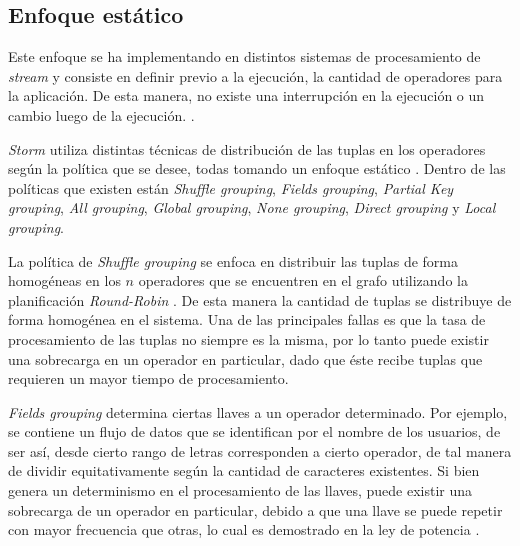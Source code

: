 
\subsection{Enfoque estático}
\label{subsec:enfoqueEstaticoBC}
Este enfoque se ha implementando en distintos sistemas de procesamiento de \textsl{stream} y consiste en definir previo a la ejecución, la cantidad de operadores para la aplicación. De esta manera, no existe una interrupción en la ejecución o un cambio luego de la ejecución. \citep{CasavantK88}.


\textsl{Storm} utiliza distintas técnicas de distribución de las tuplas en los operadores según la política que se desee, todas tomando un enfoque estático \citep{stormtwitter}. Dentro de las políticas que existen están \textit{Shuffle grouping}, \textit{Fields grouping}, \textit{Partial Key grouping}, \textit{All grouping}, \textit{Global grouping}, \textit{None grouping}, \textit{Direct grouping} y \textit{Local grouping}.

La política de \textit{Shuffle grouping} se enfoca en distribuir las tuplas de forma homogéneas en los $n$ operadores que se encuentren en el grafo utilizando la planificación \textit{Round-Robin} \citep{bookScheduling}. De esta manera la cantidad de tuplas se distribuye de forma homogénea en el sistema. Una de las principales fallas es que la tasa de procesamiento de las tuplas no siempre es la misma, por lo tanto puede existir una sobrecarga en un operador en particular, dado que éste recibe tuplas que requieren un mayor tiempo de procesamiento.

\textit{Fields grouping} determina ciertas llaves a un operador determinado. Por ejemplo, se contiene un flujo de datos que se identifican por el nombre de los usuarios, de ser así, desde cierto rango de letras corresponden a cierto operador, de tal manera de dividir equitativamente según la cantidad de caracteres existentes. Si bien genera un determinismo en el procesamiento de las llaves, puede existir una sobrecarga de un operador en particular, debido a que una llave se puede repetir con mayor frecuencia que otras, lo cual es demostrado en la ley de potencia \citep{rushton2010handbook}.

